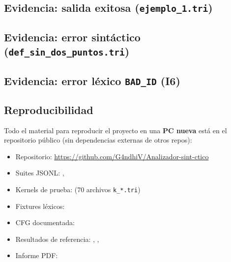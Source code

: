 \subsection{Evidencia: salida exitosa (\texttt{ejemplo\_1.tri})}

\subsection{Evidencia: error sintáctico (\texttt{def\_sin\_dos\_puntos.tri})}

\subsection{Evidencia: error léxico \texttt{BAD\_ID} (I6)}

\subsection{Reproducibilidad}
\label{sub:reproducibilidad}

\noindent Todo el material para reproducir el proyecto en una \textbf{PC nueva} está en el repositorio público (sin dependencias externas de otros repos):

\begin{itemize}
  \item Repositorio: \url{https://github.com/G4ndhiV/Analizador-sint-ctico}
  \item Suites JSONL: , 
  \item Kernels de prueba:  (70 archivos \texttt{k\_*.tri})
  \item Fixtures léxicos: 
  \item CFG documentada: 
  \item Resultados de referencia: , , 
  \item Informe PDF: 
\end{itemize}

